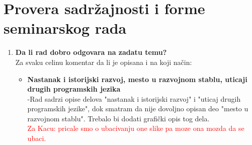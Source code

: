 \documentclass[a4paper]{report}
\newcommand{\note}[1]{\textcolor{red}{#1}}
\begin{document}
\section{Provera sadržajnosti i forme seminarskog rada}

\begin{enumerate}
\item \textbf {Da li rad dobro odgovara na zadatu temu?}\\
  Za svaku celinu komentar da li je opisana i na koji na\v cin:
\begin{itemize}
   

    \item \textbf {Nastanak i istorijski razvoj, mesto u razvojnom stablu, uticaji drugih programskih jezika} \\
      -Rad sadrzi opise delova "nastanak i istorijski razvoj" i "uticaj drugih programskih jezike", dok smatram da nije dovoljno opisan deo "mesto u razvojnom stablu". Trebalo bi dodati grafi\v cki opis tog dela. \\
\note{Za Kacu: pricale smo o ubacivanju one slike pa moze ona mozda da se ubaci.}


\end{itemize}
\end{enumerate}
\end{document}
